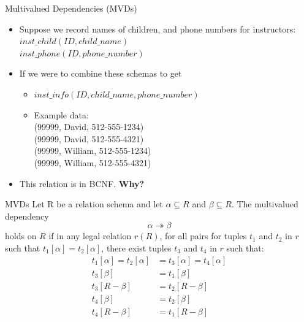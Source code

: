 \documentclass{beamer}
\begin{document}
\begin{frame}{Multivalued Dependencies (MVDs)}
    \begin{itemize}
        \item Suppose we record names of children, and phone numbers for instructors: \\
            \quad $inst\_child(ID, child\_name)$ \\
            \quad $inst\_phone(ID, phone\_number)$
        \item If we were to combine these schemas to get
            \begin{itemize}
                \item $inst\_info(ID, child\_name, phone\_number)$
                \item Example data:\\
                    \quad (99999, David, 512-555-1234) \\
                    \quad (99999, David, 512-555-4321) \\
                    \quad (99999, William, 512-555-1234) \\
                    \quad (99999, William, 512-555-4321)
            \end{itemize}
        \item This relation is in BCNF.  \textbf{Why?}
    \end{itemize}
\end{frame}

\begin{frame}{MVDs}
    Let R be a relation schema and let $\alpha \subseteq R$ and $\beta \subseteq R$. The multivalued dependency
        $$
            \alpha \twoheadrightarrow \beta
        $$
    holds on $R$ if in any legal relation $r(R)$, for all pairs for tuples $t_1$ and $t_2$ in $r$ such that $t_1[\alpha] = t_2[\alpha]$, there exist tuples $t_3$ and $t_4$ in $r$ such that:
        \begin{equation*}
            \begin{align*}
                t_1[\alpha] = t_2[\alpha] &= t_3[\alpha] = t_4[\alpha] \\
                t_3[\beta] &= t_1[\beta] \\
                t_3[R - \beta] &= t_2[R - \beta] \\
                t_4[\beta] &= t_2[\beta] \\
                t_4[R - \beta] &= t_1[R - \beta] \\
            \end{align*}
        \end{equation*}
\end{frame}
\end{document}
